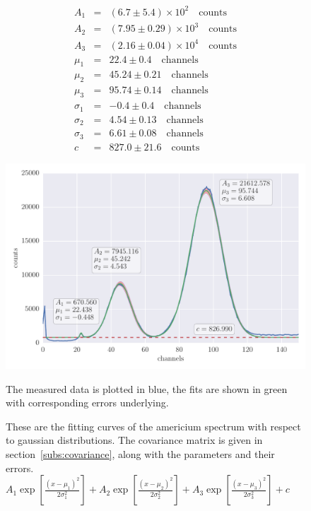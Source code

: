 \begin{align*}
    A_1 &=& \left(6.7 \pm 5.4\right) \times 10^{2} \quad \mathrm{counts}\\
    A_2 &=& \left(7.95 \pm 0.29\right) \times 10^{3} \quad\mathrm{counts}\\
    A_3 &=& \left(2.16 \pm 0.04\right) \times 10^{4} \quad\mathrm{counts}\\
    \mu_1 &=& 22.4 \pm 0.4 \quad\mathrm{channels}\\
    \mu_2 &=& 45.24 \pm 0.21 \quad\mathrm{channels}\\
    \mu_3 &=& 95.74 \pm 0.14 \quad\mathrm{channels}\\
    \sigma_1 &=& -0.4 \pm 0.4 \quad\mathrm{channels}\\
    \sigma_2 &=& 4.54 \pm 0.13 \quad\mathrm{channels}\\
    \sigma_3 &=& 6.61 \pm 0.08 \quad\mathrm{channels}\\
    c &=& 827.0 \pm 21.6\quad \mathrm{counts}
\end{align*}
\begin{figure}[htpb]
    \centering
    \includegraphics[width=1.1\linewidth]{analysis/figures/plot6_3_reg}
    \caption{These are the fitting curves of the americium spectrum with respect to gaussian distributions. The covariance matrix
        is given in section~\ref{subs:covariance}, along with the parameters and their errors.
        $A_1\exp{\left[\frac{(x-\mu_1)^2}{2 \sigma_1^2} \right]}+
         A_2\exp{\left[\frac{(x-\mu_2)^2}{2 \sigma_2^2} \right]}+
         A_3\exp{\left[\frac{(x-\mu_3)^2}{2 \sigma_3^2} \right]}+ c$}
        The measured data is plotted in blue, the fits are shown in green with corresponding 
        errors underlying. 
         \label{fig:fit1}
\end{figure}


